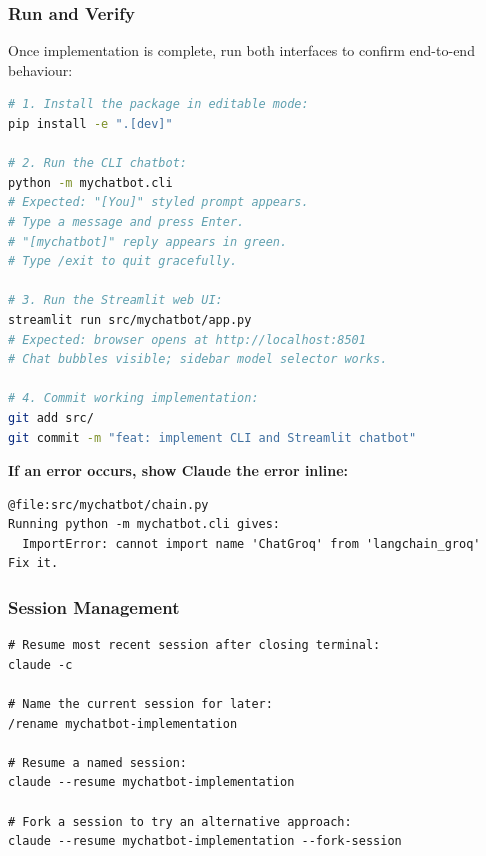\begin{frame}[fragile]\frametitle{Run and Verify}
Once implementation is complete, run both interfaces to confirm end-to-end behaviour:

\begin{lstlisting}[language=bash]
# 1. Install the package in editable mode:
pip install -e ".[dev]"

# 2. Run the CLI chatbot:
python -m mychatbot.cli
# Expected: "[You]" styled prompt appears.
# Type a message and press Enter.
# "[mychatbot]" reply appears in green.
# Type /exit to quit gracefully.

# 3. Run the Streamlit web UI:
streamlit run src/mychatbot/app.py
# Expected: browser opens at http://localhost:8501
# Chat bubbles visible; sidebar model selector works.

# 4. Commit working implementation:
git add src/
git commit -m "feat: implement CLI and Streamlit chatbot"
\end{lstlisting}

\textbf{If an error occurs, show Claude the error inline:}
\begin{lstlisting}
@file:src/mychatbot/chain.py
Running python -m mychatbot.cli gives:
  ImportError: cannot import name 'ChatGroq' from 'langchain_groq'
Fix it.
\end{lstlisting}
\end{frame}


\begin{frame}[fragile]\frametitle{Session Management}

\begin{lstlisting}
# Resume most recent session after closing terminal:
claude -c

# Name the current session for later:
/rename mychatbot-implementation

# Resume a named session:
claude --resume mychatbot-implementation

# Fork a session to try an alternative approach:
claude --resume mychatbot-implementation --fork-session
\end{lstlisting}
\end{frame}
